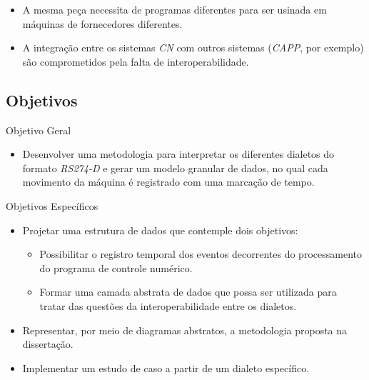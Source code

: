 \documentclass[aspectratio=169]{beamer}
\begin{document}
{\begin{frame}
\begin{itemize}
    \item {
      A mesma pe\c ca necessita de programas diferentes para ser usinada 
      em m\'aquinas de fornecedores diferentes.
    }

    \item {
      A integração entre os sistemas \emph{CN} com outros sistemas 
      (\emph{CAPP}, por exemplo) são comprometidos pela falta de 
      interoperabilidade.
    }

  \end{itemize} 

\end{frame}


\subsection{Objetivos}

\begin{frame}{Objetivo Geral}
  \begin{itemize}
    \item { 
      Desenvolver uma metodologia para interpretar os diferentes dialetos 
      do formato \emph{RS274-D} e gerar um modelo granular de dados, 
      no qual cada movimento da m\'aquina \'e registrado com uma marcação 
      de tempo.
    }
  \end{itemize}
\end{frame}

\begin{frame}{Objetivos Específicos}
  \begin{itemize}
    \item Projetar uma estrutura de dados que contemple dois objetivos:
    \begin{itemize}
        \item Possibilitar o registro temporal dos eventos decorrentes do 
              processamento do programa de controle numérico.
        \item Formar uma camada abstrata de dados que possa ser utilizada
              para tratar das questões da interoperabilidade entre os 
              dialetos.
    \end{itemize}
    \item Representar, por meio de diagramas abstratos, a metodologia proposta na dissertação.
    \item Implementar um estudo de caso a partir de um dialeto específico.
\end{itemize}
\end{frame}


}
\end{document}
